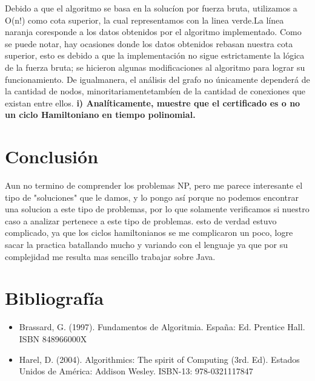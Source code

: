 \documentclass[spanish]{article}
\begin{document}
Debido  a  que  el  algoritmo  se  basa  en  la  solucíon  por  fuerza  bruta,  utilizamos  a  O(n!)  como cota superior, la cual representamos con la linea verde.La línea naranja coresponde a los datos obtenidos por el algoritmo implementado. Como se puede notar, hay ocasiones donde los datos obtenidos rebasan nuestra cota superior, esto es debido a que la implementación no sigue estrictamente la lógica de la fuerza bruta; se hicieron algunas modificaciones al algoritmo para lograr su funcionamiento. De igualmanera, el análisis del grafo no únicamente dependerá de la cantidad de nodos, minoritariamentetambíen de la cantidad de conexiones que existan entre ellos.
\newpage
	{\large{ {\bf i) Analíticamente, muestre que el certificado es o no un ciclo Hamiltoniano en tiempo polinomial.}}}\\
	

\newpage
	\section{Conclusi\'on}
	Aun no termino de comprender los problemas NP, pero me parece interesante el tipo de "soluciones" que le damos, y lo pongo así porque no podemos encontrar una solucion a este tipo de problemas, por lo que solamente verificamos si nuestro caso a analizar pertenece a este tipo de problemas. esto de verdad estuvo complicado, ya que los ciclos hamiltonianos se me complicaron un poco, logre sacar la practica batallando mucho y variando con el lenguaje ya que por su complejidad me resulta mas sencillo trabajar sobre Java.


	

\newpage
	\section{Bibliografía}
	\begin{itemize}
		\item Brassard, G. (1997). Fundamentos de Algoritmia. España: Ed. Prentice Hall. ISBN 		848966000X
		\item Harel, D. (2004). Algorithmics: The spirit of Computing (3rd. Ed). Estados Unidos de América: Addison
Wesley. ISBN-13: 978-0321117847
	\end{itemize}
\end{document}
